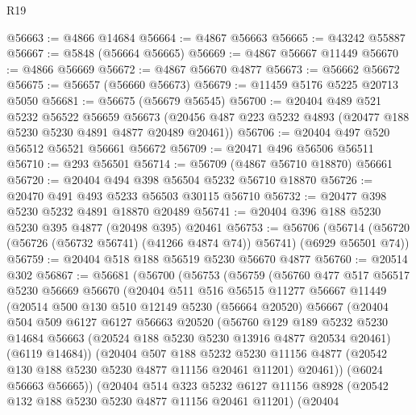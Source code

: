 \begin{lexlean}{R19}
\begin{coremodule}
@56663 := @4866 @14684
@56664 := @4867 @56663
@56665 := @43242 @55887
@56667 := @5848 (@56664 @56665)
@56669 := @4867 @56667 @11449
@56670 := @4866 @56669
@56672 := @4867 @56670 @4877
@56673 := @56662 @56672
@56675 := @56657 (@56660 @56673)
@56679 := @11459 @5176 @5225 @20713 @5050
@56681 := @56675 (@56679 @56545)
@56700 := @20404
    @489
    @521
    @5232
    @56522
    @56659
    @56673
    (@20456 @487 @223 @5232 @4893 (@20477 @188 @5230 @5230 @4891 @4877 @20489 @20461))
@56706 := @20404 @497 @520 @56512 @56521 @56661 @56672
@56709 := @20471 @496 @56506 @56511
@56710 := @293 @56501
@56714 := @56709 (@4867 @56710 @18870) @56661
@56720 := @20404 @494 @398 @56504 @5232 @56710 @18870
@56726 := @20470 @491 @493 @5233 @56503 @30115 @56710
@56732 := @20477 @398 @5230 @5232 @4891 @18870 @20489
@56741 := @20404 @396 @188 @5230 @5230 @395 @4877 (@20498 @395) @20461
@56753 := @56706
    (@56714 (@56720 (@56726 (@56732 @56741) (@41266 @4874 @74)) @56741) (@6929 @56501 @74))
@56759 := @20404 @518 @188 @56519 @5230 @56670 @4877
@56760 := @20514 @302
@56867 := @56681
    (@56700
      (@56753
        (@56759
          (@56760
            @477
            @517
            @56517
            @5230
            @56669
            @56670
            (@20404
              @511
              @516
              @56515
              @11277
              @56667
              @11449
              (@20514
                @500
                @130
                @510
                @12149
                @5230
                (@56664 @20520)
                @56667
                (@20404
                  @504
                  @509
                  @6127
                  @6127
                  @56663
                  @20520
                  (@56760
                    @129
                    @189
                    @5232
                    @5230
                    @14684
                    @56663
                    (@20524 @188 @5230 @5230 @13916 @4877 @20534 @20461)
                    (@6119 @14684))
                  (@20404
                    @507
                    @188
                    @5232
                    @5230
                    @11156
                    @4877
                    (@20542 @130 @188 @5230 @5230 @4877 @11156 @20461 @11201)
                    @20461))
                (@6024 @56663 @56665))
              (@20404
                @514
                @323
                @5232
                @6127
                @11156
                @8928
                (@20542 @132 @188 @5230 @5230 @4877 @11156 @20461 @11201)
                (@20404

\end{coremodule}
\end{lexlean}
